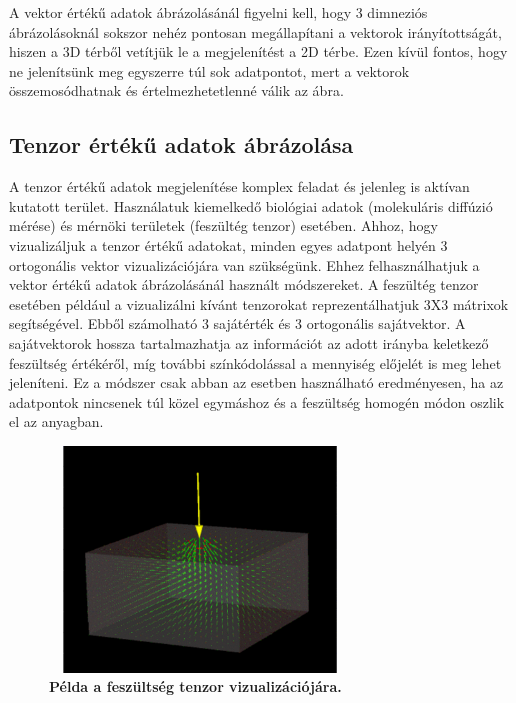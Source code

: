\documentclass[12pt]{article}
\theoremstyle{plain}
\begin{document}
 A vektor értékű adatok ábrázolásánál figyelni kell, hogy 3 dimneziós ábrázolásoknál sokszor nehéz pontosan megállapítani a vektorok irányítottságát, hiszen a 3D térből vetítjük le a megjelenítést a 2D térbe. Ezen kívül fontos, hogy ne jelenítsünk meg egyszerre túl sok adatpontot, mert a vektorok összemosódhatnak és értelmezhetetlenné válik az ábra. 
 
  \subsection{Tenzor értékű adatok ábrázolása}
 A tenzor értékű adatok megjelenítése komplex feladat és jelenleg is aktívan kutatott terület. Használatuk kiemelkedő biológiai adatok (molekuláris diffúzió mérése) és mérnöki területek (feszültég tenzor) esetében. Ahhoz, hogy vizualizáljuk a tenzor értékű adatokat, minden egyes adatpont helyén 3 ortogonális vektor vizualizációjára van szükségünk. Ehhez felhasználhatjuk a vektor értékű adatok ábrázolásánál használt módszereket. \newline
 A feszültég tenzor esetében például a vizualizálni kívánt tenzorokat reprezentálhatjuk 3X3 mátrixok segítségével. Ebből számolható 3 sajátérték és 3 ortogonális sajátvektor. A sajátvektorok hossza tartalmazhatja az információt az adott irányba keletkező feszültség értékéről, míg további színkódolással a mennyiség előjelét is meg lehet jeleníteni. Ez a módszer csak abban az esetben használható eredményesen, ha az adatpontok nincsenek túl közel egymáshoz és a feszültség homogén módon oszlik el az anyagban. \newline

 
 
  \begin{figure}[H]
    \centering
    \includegraphics[width=8cm, height=6cm]{media/stress.png}
    \caption{\textbf{Példa a feszültség tenzor vizualizációjára.}}
    \label{fig:GeneralDiagram}
 \end{figure}
 
\end{document}
